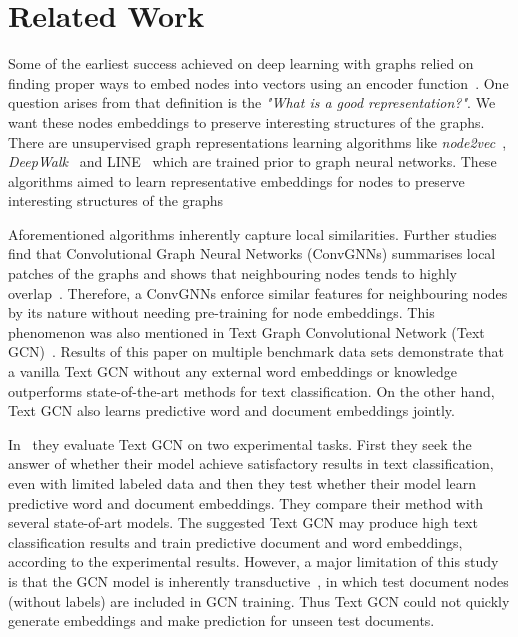 \section{Related Work}\label{sec:related}
Some of the earliest success achieved on deep learning with graphs relied on finding proper ways to embed nodes into vectors using an encoder function~\autocite{velickovic21gnn}. One question arises from that definition is the \emph{"What is a good representation?"}. We want these nodes embeddings to preserve interesting structures of the graphs. There are unsupervised graph representations learning algorithms like \emph{node2vec}~\autocite{node2vec}, \emph{DeepWalk}~\autocite{deepwalk2014} and LINE~\autocite{line2015} which are trained prior to graph neural networks. These algorithms aimed to learn representative embeddings for nodes to preserve interesting structures of the graphs

Aforementioned algorithms inherently capture local similarities. Further studies find that Convolutional Graph Neural Networks (ConvGNNs) summarises local patches of the graphs and shows that neighbouring nodes tends to highly overlap~\autocite{velickovic21gnn}. Therefore, a ConvGNNs enforce similar features for neighbouring nodes by its nature without needing pre-training for node embeddings. This phenomenon was also mentioned in Text Graph Convolutional Network (Text GCN)~\autocite{yao18graph}. Results of this paper on multiple benchmark data sets demonstrate that a vanilla Text GCN without any external word embeddings or knowledge outperforms state-of-the-art methods for text classification. On the other hand, Text GCN also learns predictive word and document embeddings jointly.

In~\autocite{yao18graph} they evaluate Text GCN on two experimental tasks. First they seek the answer of whether their model achieve satisfactory results in text classification, even with limited labeled data and then they test whether their model learn predictive word and document embeddings. They compare their method with several state-of-art models. The suggested Text GCN may produce high text classification results and train predictive document and word embeddings, according to the experimental results. However, a major limitation of this study is that the GCN model is inherently transductive~\autocite{yao18graph}, in which test document nodes (without labels) are included in GCN training. Thus Text GCN could not quickly generate embeddings and make prediction for unseen test documents.

